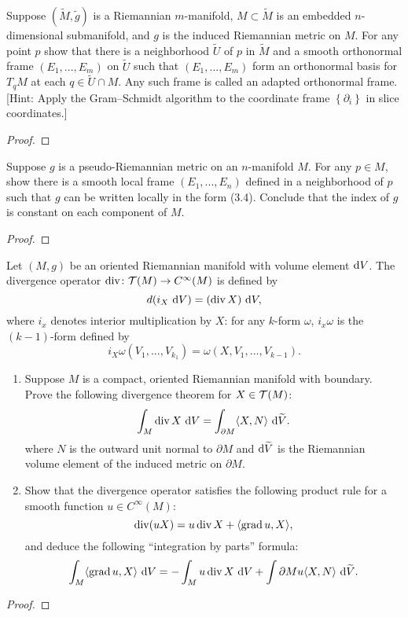 \begin{problem}
Suppose $(\widetilde M,\tilde g)$ is a Riemannian $m$-manifold,
$M\subset\widetilde M$ is an embedded $n$-dimensional submanifold, and $g$
is the induced Riemannian metric on $M$. For any point $p$ show that there
is a neighborhood $\widetilde U$ of $p$ in $\widetilde M$ and a smooth
orthonormal frame $(E_1,...,E_m)$ on $\widetilde U$ such that
$(E_1,...,E_m)$ form an orthonormal basis for $T_qM$ at each
$q\in\widetilde{U}\cap M$. Any such frame is called an adapted orthonormal
frame. [Hint: Apply the Gram--Schmidt algorithm to the coordinate frame
$\left\{\partial_i\right\}$ in slice coordinates.]
\end{problem}
\begin{proof}
\end{proof}
\newpage

\begin{problem}
Suppose $g$ is a pseudo-Riemannian metric on an $n$-manifold $M$. For any
$p\in M$, show there is a smooth local frame $(E_1,...,E_n)$ defined in a
neighborhood of $p$ such that $g$ can be written locally in the form
(3.4). Conclude that the index of $g$ is constant on each component of
$M$.
\end{problem}
\begin{proof}
\end{proof}
\newpage

\begin{problem}
Let $(M,g)$ be an oriented Riemannian manifold with volume element
$\operatorname{d\!} V$. The divergence operator $\operatorname{div}\colon\mathcal{T}(M)\to C^\infty(M)$ is
defined by
\[
d(i_X\,\operatorname{d\!} V)=(\operatorname{div} X)\,\operatorname{d\!} V,
\]
where $i_x$ denotes interior multiplication by $X$: for any $k$-form
$\omega$, $i_x\omega$ is the $(k-1)$-form defined by
\[
i_X\omega(V_1,...,V_{k_1})=\omega(X,V_1,...,V_{k-1}).
\]
\begin{enumerate}[label=(\alph*)]
\item Suppose $M$ is a compact, oriented Riemannian manifold with
  boundary. Prove the following divergence theorem for $X\in\mathcal{T}(M)$:
\[
\int_M\operatorname{div} X\,\operatorname{d\!} V=\int_{\partial M}\langle X,N \rangle\,\operatorname{d\!}\widetilde V.
\]
where $N$ is the outward unit normal to $\partial M$ and $\operatorname{d\!}\widetilde V$ is
the Riemannian volume element of the induced metric on $\partial M$.
\item Show that the divergence operator satisfies the following product
  rule for a smooth function $u\in C^\infty(M)$:
\[
\operatorname{div}(uX)=u\operatorname{div} X+\langle\operatorname{grad} u,X\rangle,
\]
and deduce the following ``integration by parts'' formula:
\[
\int_M\langle\operatorname{grad} u,X\rangle\,\operatorname{d\!} V=-\int_M u\operatorname{div} X\,\operatorname{d\!} V+\int{\partial M}
u\langle X,N\rangle\,\operatorname{d\!}\widetilde V.
\]
\end{enumerate}
\end{problem}
\begin{proof}
\end{proof}
\newpage

